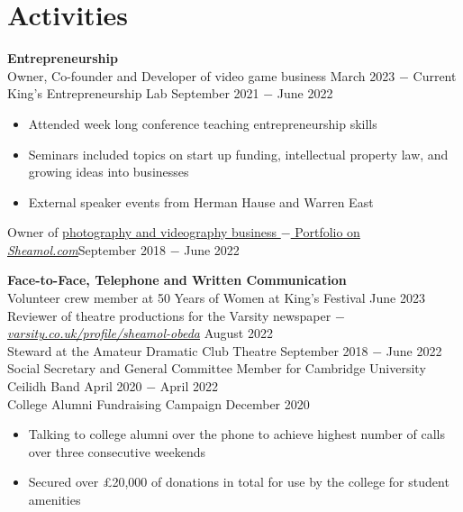 \documentclass[8pt]{article}
\begin{document}

\vspace{-0.75\baselineskip}
\hrulefill
\vspace{-0.75\baselineskip}

\clearpage
\section*{Activities}

\textbf{Entrepreneurship}\\
Owner, Co-founder and Developer of video game business \hfill March 2023 $-$ Current \\
King's Entrepreneurship Lab \hfill September 2021 $-$ June 2022
\begin{itemize}
    \item Attended week long conference teaching entrepreneurship skills
    \item Seminars included topics on start up funding, intellectual property law, and growing ideas into businesses
    \item External speaker events from Herman Hause and Warren East 
\end{itemize}
Owner of \href{www.sheamol.com}{photography and videography business $-$ Portfolio on \underline{\textit{Sheamol.com}}}\hfill September 2018 $-$ June 2022\medskip

\textbf{Face-to-Face, Telephone and Written Communication}\\
Volunteer crew member at 50 Years of Women at King's Festival \hfill June 2023\\
Reviewer of theatre productions for the Varsity newspaper $-$ \href{https://www.varsity.co.uk/profile/sheamol-obeda}{\underline{\textit{varsity.co.uk/profile/sheamol-obeda}}} \hfill August 2022 \\
Steward at the Amateur Dramatic Club Theatre \hfill September 2018 $-$ June 2022 \\
Social Secretary and General Committee Member for Cambridge University Ceilidh Band \hfill April 2020 $-$ April 2022\\
College Alumni Fundraising Campaign \hfill December 2020
\begin{itemize}
    \item Talking to college alumni over the phone to achieve highest number of calls over three consecutive weekends
    \item Secured over £20,000 of donations in total for use by the college for student amenities
\end{itemize} \medskip
\end{document}
